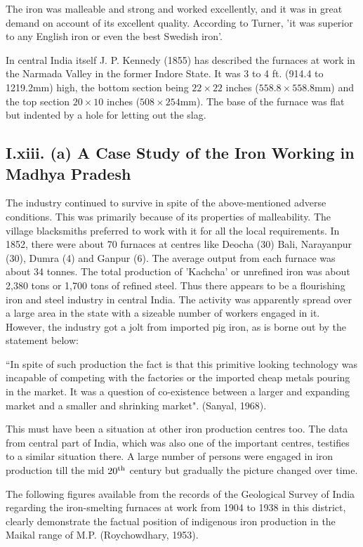 The iron was malleable and strong and worked excellently, and it was in great demand on account of its excellent quality. According to Turner, 'it was superior to any English iron or even the best Swedish iron'. 

In central India itself J. P. Kennedy (1855) has described the furnaces at work in the Narmada Valley in the former Indore State. It was 3 to 4 ft. (914.4 to 1219.2mm) high, the bottom section being $22 \times 22$ inches ($558.8 \times 558.8$mm) and the top section $20 \times 10$ inches ($508 \times 254$mm). The base of the furnace was flat but indented by a hole for letting out the slag.

\subsection*{I.xiii. (a) A Case Study of the Iron Working in Madhya Pradesh}\label{subsection-13}

The industry continued to survive in spite of the above-mentioned adverse conditions.  This was primarily because of its properties of malleability. The village blacksmiths preferred to work with it for all the local requirements. In 1852, there were about 70 furnaces at centres like Deocha (30) Bali, Narayanpur (30), Dumra (4) and Ganpur (6).  The average output from each furnace was about 34 tonnes.  The total production of 'Kachcha' or unrefined iron was about 2,380 tons or 1,700 tons of refined steel. Thus there appears to be a flourishing iron and steel industry in central India. The activity was apparently spread over a large area in the state with a sizeable number of workers engaged in it. However, the industry got a jolt from imported pig iron, as is borne out by the statement below:  

“In spite of such production the fact is that this primitive looking technology was incapable of competing with the factories or the imported cheap metals pouring in the market.  It was a question of co-existence between a larger and expanding market and a smaller and shrinking market". (Sanyal, 1968). 

This must have been a situation at other iron production centres too.  The data from central part of India, which was also one of the important centres, testifies to a similar situation there. A large number of persons were engaged in iron production till the mid $20^{\rm th}$ century but gradually the picture changed over time.

The following figures available from the records of the Geological Survey of India regarding the iron-smelting furnaces at work from 1904 to 1938 in this district, clearly demonstrate the factual position of indigenous iron production in the Maikal range of M.P. (Roychowdhary, 1953).

